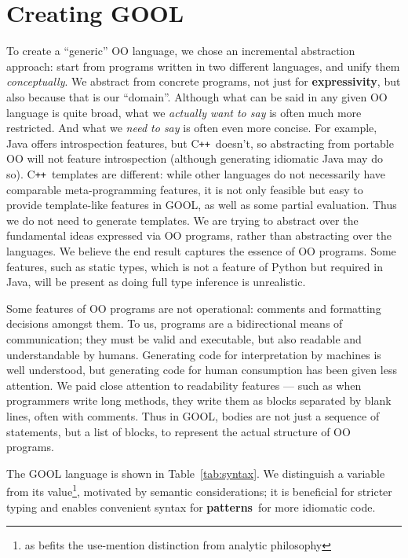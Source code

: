 \documentclass[sigplan,review,prologue,dvipsnames]{acmart}
\newcommand{\Cplusplus}{C\texttt{++}}
\newcommand{\abbrev}[1]{\textbf{#1}}
\newcommand{\oopatterns}{\abbrev{patterns}}
\newcommand{\expressivity}{\abbrev{expressivity}}
\begin{document}
\section{Creating GOOL} \label{sec:creating}

To create a ``generic'' OO language,
we chose an incremental abstraction approach: start from programs written in 
two different languages, and unify them \emph{conceptually}.
We abstract from concrete programs, not just for
\expressivity, but also because that is our ``domain''.  Although
what can be said in any given OO language is quite broad, what we
\emph{actually want to say} is often much more restricted. And what we
\emph{need to say} is often even more concise.
For example, Java offers introspection features, but \Cplusplus~doesn't, so
abstracting from portable OO will not feature introspection (although
generating idiomatic Java may do so). \Cplusplus~templates
are different: while other languages do not necessarily have comparable
meta-programming features, it is not only feasible but easy to provide
template-like features in GOOL, as well as some
partial evaluation. Thus we do not need to generate templates.
We are trying to abstract over the fundamental ideas
expressed via OO programs, rather than abstracting over the languages.
We believe the end result captures the essence of OO programs.
Some features, such as static types, which is not a feature of
Python but required in Java, will be present
as doing full type inference is unrealistic.

Some features of OO programs are not operational: comments and formatting
decisions amongst them.  To us, programs are a bidirectional means of
communication; they must be valid and executable, but
also readable and understandable by humans.
Generating code for interpretation by machines is well understood,
but generating code for human consumption has been given less 
attention. We paid close attention to readability features --- such
as when programmers write long methods, they write them as blocks separated
by blank lines, often with comments.
Thus in GOOL, bodies are not just a sequence of statements, but a 
list of blocks, to represent the actual structure of OO programs.

The GOOL language is shown in Table~\ref{tab:syntax}. We 
distinguish a variable from its value\footnote{as befits the use-mention
distinction from analytic philosophy}, motivated by
semantic considerations; it is beneficial for stricter typing and enables
convenient syntax for \oopatterns~for more idiomatic code.
\end{document}
